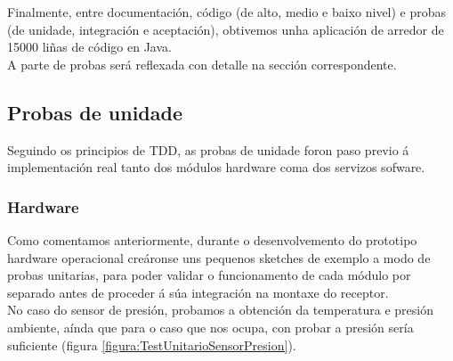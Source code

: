    Finalmente, entre documentación, código (de alto, medio e baixo nivel) e
   probas (de unidade, integración e aceptación), obtivemos unha aplicación de
   arredor de 15000 liñas de código en Java. \\
   
   A parte de probas será reflexada con detalle na sección correspondente.
   
 \subsection{Probas de unidade}
 
 Seguindo os principios de TDD, as probas de unidade foron paso previo á
 implementación real tanto dos módulos hardware coma dos servizos sofware.
 
  \subsubsection{Hardware}
  
  
  Como comentamos anteriormente, durante o desenvolvemento do prototipo hardware
  operacional creáronse uns pequenos sketches de exemplo a modo de probas
  unitarias, para poder validar o funcionamento de cada módulo por separado
  antes de proceder á súa integración na montaxe do receptor. \\
  
  No caso do sensor de presión, probamos a obtención da temperatura e presión
  ambiente, aínda que para o caso que nos ocupa, con probar a presión sería
  suficiente (figura \ref{figura:TestUnitarioSensorPresion}). \\
  
